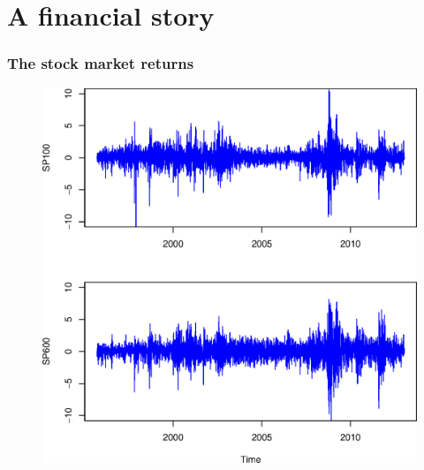 \documentclass{beamer}
\begin{document}
\section{A financial story}
 \begin{frame}
  \frametitle{The stock market returns}
    \begin{figure}
      \centering
      \includegraphics[height=0.9\textheight]{SP100-SP600}
    \end{figure}
\end{frame}
\end{document}
